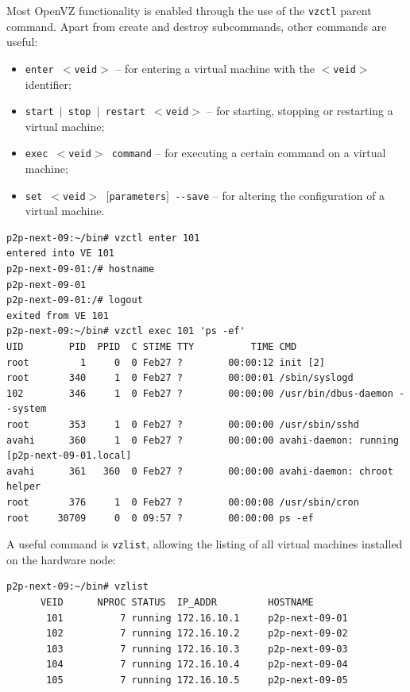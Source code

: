 Most OpenVZ functionality is enabled through the use of the \texttt{vzctl}
parent command. Apart from create and destroy subcommands, other commands are
useful:

\begin{itemize}
  \item \texttt{enter $<$veid$>$} -- for entering a virtual machine with the
  \texttt{$<$veid$>$} identifier;
  \item \texttt{start $|$ stop $|$ restart $<$veid$>$} -- for starting,
  stopping or restarting a virtual machine;
  \item \texttt{exec $<$veid$>$ command} -- for executing a certain command on
  a virtual machine;
  \item \texttt{set $<$veid$>$ $[$parameters$]$ -{}-save} -- for altering the
  configuration of a virtual machine.
\end{itemize}

\footnotesize
\begin{verbatim}
p2p-next-09:~/bin# vzctl enter 101
entered into VE 101
p2p-next-09-01:/# hostname
p2p-next-09-01
p2p-next-09-01:/# logout
exited from VE 101
p2p-next-09:~/bin# vzctl exec 101 'ps -ef'
UID        PID  PPID  C STIME TTY          TIME CMD
root         1     0  0 Feb27 ?        00:00:12 init [2]
root       340     1  0 Feb27 ?        00:00:01 /sbin/syslogd
102        346     1  0 Feb27 ?        00:00:00 /usr/bin/dbus-daemon --system
root       353     1  0 Feb27 ?        00:00:00 /usr/sbin/sshd
avahi      360     1  0 Feb27 ?        00:00:00 avahi-daemon: running [p2p-next-09-01.local]
avahi      361   360  0 Feb27 ?        00:00:00 avahi-daemon: chroot helper
root       376     1  0 Feb27 ?        00:00:08 /usr/sbin/cron
root     30709     0  0 09:57 ?        00:00:00 ps -ef
\end{verbatim}
\normalsize

A useful command is \texttt{vzlist}, allowing the listing of all virtual
machines  installed on the hardware node:

\footnotesize
\begin{verbatim}
p2p-next-09:~/bin# vzlist
      VEID      NPROC STATUS  IP_ADDR         HOSTNAME
       101          7 running 172.16.10.1     p2p-next-09-01
       102          7 running 172.16.10.2     p2p-next-09-02
       103          7 running 172.16.10.3     p2p-next-09-03
       104          7 running 172.16.10.4     p2p-next-09-04
       105          7 running 172.16.10.5     p2p-next-09-05
\end{verbatim}
\normalsize

